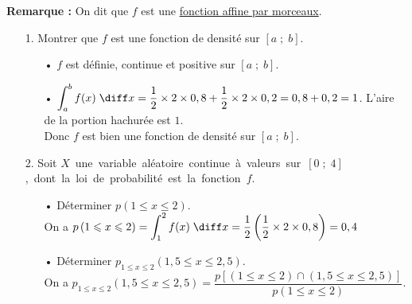 \vspace*{.3cm}

\textbf{Remarque :} On dit que $f$ est une \underline{fonction affine par morceaux}. \\

\begin{itemize}
\item[1.] Montrer que $f$ est une fonction de densité sur $\left[a \; ; \; b\right]$. \\

\begin{itemize}
\item[•] $f$ est définie, continue et positive sur $\left[a \; ; \; b\right]$. 
\item[•] $\displaystyle{\int_a^b f(x) \; \diff x} = \dfrac{1}{2} \times 2 \times 0,8 + \dfrac{1}{2} \times 2 \times 0,2 = 0,8 + 0,2 = 1$. L'aire de la portion hachurée est $1$. \\

Donc $f$ est bien une fonction de densité sur $\left[a \; ; \; b\right]$. \\
\end{itemize}

\item[2.] Soit \hbox{$X$ une variable aléatoire continue à valeurs sur $\left[0 \; ; \; 4\right]$, dont la loi de probabilité est la fonction $f$.} \\

\begin{itemize}
\item[•] Déterminer $p\left(1 \leqslant x \leqslant 2\right)$. \\

On a $p\left(1 \leqslant x \leqslant 2\right) = \displaystyle{\int_1^2 f(x) \; \diff x} = \dfrac{1}{2}\left(\dfrac{1}{2} \times 2 \times 0,8\right) = 0,4$

\vspace*{.3cm}

\item[•] Déterminer $p_{1 \leqslant x \leqslant 2}\left(1,5 \leqslant x \leqslant 2,5\right)$. \\

On a $p_{1 \leqslant x \leqslant 2}\left(1,5 \leqslant x \leqslant 2,5\right) = \dfrac{p\left[\left(1 \leqslant x \leqslant 2\right) \cap \left(1,5 \leqslant x \leqslant 2,5\right)\right]}{p\left(1 \leqslant x \leqslant 2\right)}$. \vspace*{.3cm} \\


\end{itemize}
\end{itemize}
